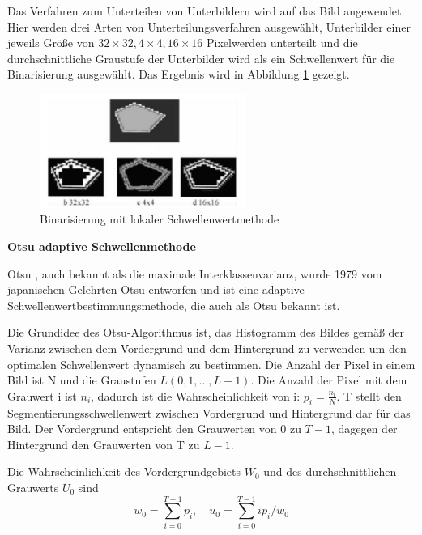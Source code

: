 Das Verfahren zum Unterteilen von Unterbildern wird auf das Bild angewendet. Hier werden drei Arten von Unterteilungsverfahren ausgewählt, Unterbilder einer jeweils Größe von $ 32\times32, 4 \times4, 16\times16 $ Pixelwerden unterteilt und die durchschnittliche Graustufe der Unterbilder wird als ein Schwellenwert für die Binarisierung ausgewählt. Das Ergebnis wird in Abbildung \ref{fig:Binarisierung mit lokalen Schwellenwertmethode} gezeigt.

\begin{figure}[H]
 \centering 
  \includegraphics[keepaspectratio,width=0.6\textwidth]{images/4_ZweiteErfahrung/Binar/adaptive.pdf}
 \caption{Binarisierung mit lokaler Schwellenwertmethode}
 \label{fig:Binarisierung mit lokalen Schwellenwertmethode}
\end{figure} 

\textbf{Otsu adaptive Schwellenmethode}

Otsu \cite{Ostu}, auch bekannt als die maximale Interklassenvarianz, wurde 1979 vom japanischen Gelehrten Otsu entworfen und ist eine adaptive Schwellenwertbestimmungsmethode, die auch als Otsu bekannt ist.

Die Grundidee des Otsu-Algorithmus ist, das Histogramm des Bildes gemäß der Varianz zwischen dem Vordergrund und dem Hintergrund zu verwenden um den optimalen Schwellenwert dynamisch zu bestimmen. Die Anzahl der Pixel in einem Bild ist N und die Graustufen $ L(0,1,...,L-1) $. Die Anzahl der Pixel mit dem Grauwert i ist $ n_{i} $, dadurch ist die Wahrscheinlichkeit von i: $ p_{i} = \frac{n_{i}}{N} $. T stellt den Segmentierungsschwellenwert zwischen Vordergrund und Hintergrund dar für das Bild. Der Vordergrund entspricht den Grauwerten von 0 zu $ T-1 $, dagegen der Hintergrund den Grauwerten von T zu $ L -1 $.

Die Wahrscheinlichkeit des Vordergrundgebiets $ W_{0} $ und des durchschnittlichen Grauwerts $ U_{0} $ sind
\begin{equation}
  w_{0} = \sum_{i=0}^{T-1} p_{i},\quad u_{0} = \sum_{i=0}^{T-1} ip_{i}/w_{0}
\end{equation}

